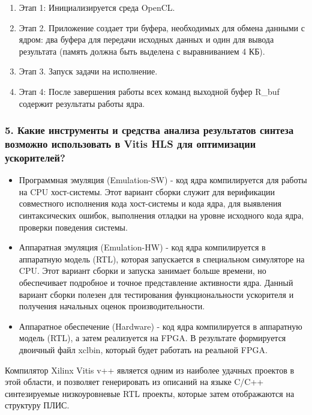 \begin{enumerate}
	\item Этап 1: Инициализируется среда OpenCL.
	\item Этап 2. Приложение создает три буфера, необходимых для обмена данными с ядром: два буфера для передачи исходных данных и один для вывода результата (память должна быть выделена с выравниванием 4 КБ). 
	\item Этап 3. Запуск задачи на исполнение.
	\item Этап 4: После завершения работы всех команд выходной буфер R\_buf содержит результаты работы ядра. 
\end{enumerate}


\subsubsection{\textbf{5. Какие инструменты и средства анализа результатов синтеза возможно использовать в Vitis HLS для оптимизации ускорителей?}}
\begin{itemize}
	\item Программная эмуляция (Emulation-SW) - код ядра компилируется для работы на CPU хост-системы. Этот вариант сборки служит для верификации совместного исполнения кода хост-системы и кода ядра, для выявления синтаксических ошибок, выполнения отладки на уровне исходного кода ядра, проверки поведения системы.
	\item Аппаратная эмуляция (Emulation-HW) - код ядра компилируется в аппаратную модель (RTL), которая запускается в специальном симуляторе на CPU. Этот вариант сборки и запуска занимает больше времени, но обеспечивает подробное и точное представление активности ядра. Данный вариант сборки полезен для тестирования функциональности ускорителя и получения начальных оценок производительности.
	\item Аппаратное обеспечение (Hardware) - код ядра компилируется в аппаратную модель (RTL), а затем реализуется на FPGA. В результате формируется двоичный файл xclbin, который будет работать на реальной FPGA.
\end{itemize}



Компилятор Xilinx Vitis v++ является одним из наиболее удачных проектов в этой области, и позволяет генерировать из описаний на языке C/C++ синтезируемые низкоуровневые RTL проекты, которые затем отображаются на структуру ПЛИС. 
